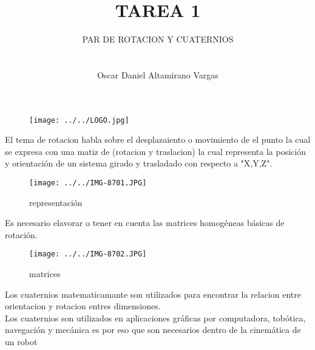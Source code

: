 \documentclass[12pt]{article}
\title{TAREA 1}
\author{PAR DE ROTACION Y CUATERNIOS\\ \\ \\ Oscar Daniel Altamirano Vargas\\}
\begin{document}
 
\maketitle
\begin{figure}[hbtp]

\centering
\texttt{[image: ../../LOGO.jpg]}
\end{figure}

\pagebreak
El tema de rotacion habla sobre el desplazaiento o movimiento de el punto la cual se expresa con una matiz de (rotacion y traslacion) la cual representa la posición y orientación de un sistema girado y trasladado con respecto a "X,Y,Z". \\ \begin{figure}[hbtp]
\centering
\texttt{[image: ../../IMG-8701.JPG]}
\caption{representación }
\end{figure}

Es necesario elavorar o tener en cuenta las matrices homogéneas básicas de rotación.\\
\begin{figure}[hbtp]
\caption{matrices}
\centering
\texttt{[image: ../../IMG-8702.JPG]}
\end{figure}

Los cuaternios matematicamante son utilizados para encontrar la relacion entre orientacion y rotacion entres dimensiones.\\
Los cuaternios son utilizados en aplicaciones gráficas por computadora, tobótica, navegación y mecánica es por eso que son necesarios dentro de la cinemática de un robot 
\end{document}
